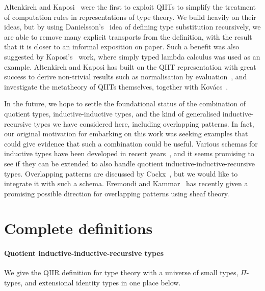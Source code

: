 \documentclass[a4paper,UKenglish,numberwithinsect,cleveref,thm-restate]{lipics-v2021}
\newcommand{\LT}[2][]{\todo[inline,author={L-T},caption={},color={pink},#1]{#2}}
\begin{document}
Altenkirch and Kaposi~\cite{Altenkirch2016a} were the first to exploit QIITs to simplify the treatment of computation rules in representations of type theory.%
We build heavily on their ideas, but by using Danielsson's~\cite{Danielsson2006} idea of defining type substitution recursively, we are able to remove many explicit transports from the definition, with the result that it is closer to an informal exposition on paper. Such a benefit was also suggested by Kaposi's~\cite{Kaposi2023} work, where simply typed lambda calculus was used as an example. Altenkirch and Kaposi has built on the QIIT representation with great success to derive non-trivial results such as normalisation by evaluation~\cite{Altenkirch2017}, and investigate the metatheory of QIITs themselves, together with Kov\'acs~\cite{Kaposi2019}.

In the future, we hope to settle the foundational status of the
combination of quotient types, inductive-inductive types, and the kind
of generalised inductive-recursive types we have considered here,
including overlapping patterns. In fact, our original motivation for
embarking on this work was seeking examples that could give evidence
that such a combination could be useful.
%
Various schemas for inductive types have been developed in recent
years~\cite{Ghani2017,Kaposi2018,Kovacs2023}, and it seems
promising to see if they can be extended to also handle quotient
inductive-inductive-recursive types. Overlapping patterns are
discussed by Cockx~\cite{Cockx2014}, but we would like to integrate it
with such a schema. Eremondi and Kammar~\cite{Eremondi2025} has
recently given a promising possible direction for overlapping patterns
using sheaf theory.



\appendix

\section{Complete definitions}\label{appendix:full-def}

\paragraph*{Quotient inductive-inductive-recursive types}
We give the QIIR definition for type theory with a universe of small types, $\Pi$-types, and extensional identity types in one place below.
\end{document}
